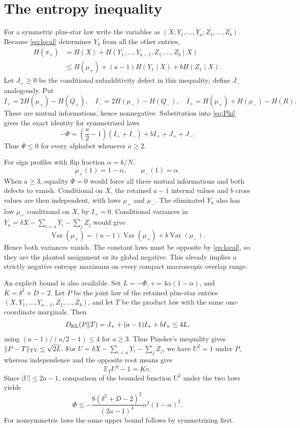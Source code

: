\documentclass[11pt]{article}
\newcommand{\E}{\mathbb E}
\begin{document}
\section{The entropy inequality}
For a symmetric plus-star law write the variables as
$(X;Y_1,\ldots,Y_a;Z_1,\ldots,Z_b)$. Because \eqref{eq:local} determines $Y_a$ from all the other entries,
\begin{align*}
 H(\pi_+)
 &=H(X)+H(Y_1,\ldots,Y_{a-1},Z_1,\ldots,Z_b\mid X)\\
 &\le H(\mu_+)+(a-1)H(Y_1\mid X)+bH(Z_1\mid X).
\end{align*}
Let $J_+\ge0$ be the conditional subadditivity defect in this inequality; define $J_-$ analogously. Put
\[
 I_+=2H(\mu_+)-H(Q_+),\quad
 I_-=2H(\mu_-)-H(Q_-),\quad
 I_\times=H(\mu_+)+H(\mu_-)-H(R).
\]
These are mutual informations, hence nonnegative. Substitution into \eqref{eq:Phi} gives the exact identity for symmetrized laws
\begin{equation}\label{eq:MI}
 -\Phi=\left(\frac a2-1\right)(I_++I_-)+bI_\times+J_++J_-.
\end{equation}
Thus $\Phi\le0$ for every alphabet whenever $a\ge2$.

For sign profiles with flip fraction $\alpha=k/N$,
\[
 \mu_+(1)=1-\alpha,\qquad \mu_-(1)=\alpha.
\]
When $a\ge3$, equality $\Phi=0$ would force all three mutual informations and both defects to vanish. Conditional on $X$, the retained $a-1$ internal values and $b$ cross values are then independent, with laws $\mu_+$ and $\mu_-$. The eliminated $Y_a$ also has law $\mu_+$ conditional on $X$, by $I_+=0$. Conditional variances in
$Y_a=\delta X-\sum_{i<a}Y_i-\sum_jZ_j$ would give
\[
 \operatorname{Var}(\mu_+)=(a-1)\operatorname{Var}(\mu_+)+b\operatorname{Var}(\mu_-).
\]
Hence both variances vanish. The constant laws must be opposite by \eqref{eq:local}, so they are the planted assignment or its global negative. This already implies a strictly negative entropy maximum on every compact macroscopic overlap range.

An explicit bound is also available. Set $L=-\Phi$, $v=4\alpha(1-\alpha)$, and $K=\delta^2+D-2$. Let $P$ be the joint law of the retained plus-star entries $(X,Y_1,\ldots,Y_{a-1},Z_1,\ldots,Z_b)$, and let $T$ be the product law with the same one-coordinate marginals. Then
\[
 D_{\rm KL}(P\Vert T)=J_++(a-1)I_++bI_\times\le4L,
\]
using $(a-1)/(a/2-1)\le4$ for $a\ge3$. Thus Pinsker's inequality gives $\|P-T\|_{\rm TV}\le\sqrt{2L}$. For
$U=\delta X-\sum_{i<a}Y_i-\sum_jZ_j$, we have $U^2=1$ under $P$, whereas independence and the opposite root means give
\[
 \E_T U^2-1=Kv.
\]
Since $|U|\le2a-1$, comparison of the bounded function $U^2$ under the two laws yields
\begin{equation}\label{eq:gap}
 \Phi\le-\frac{8(\delta^2+D-2)^2}{(2a-1)^4}
 \alpha^2(1-\alpha)^2.
\end{equation}
For nonsymmetric laws the same upper bound follows by symmetrizing first.
\end{document}
